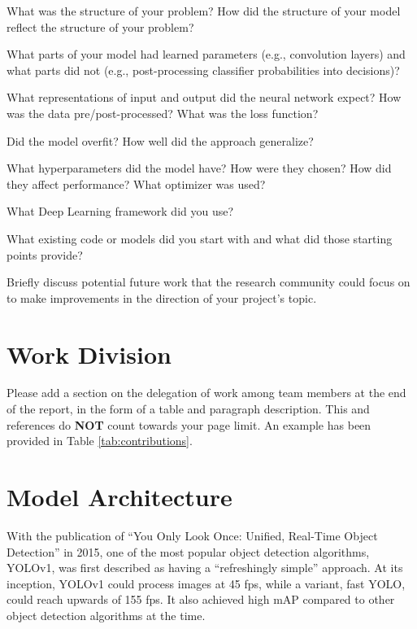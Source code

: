 \documentclass[10pt,twocolumn,letterpaper]{article}
\begin{document}
What was the structure of your problem? How did the structure of your model reflect the structure of your problem? 

What parts of your model had learned parameters (e.g., convolution layers) and what parts did not (e.g., post-processing classifier probabilities into decisions)? 

What representations of input and output did the neural network expect? How was the data pre/post-processed?
What was the loss function? 

Did the model overfit? How well did the approach generalize? 

What hyperparameters did the model have? How were they chosen? How did they affect performance? What optimizer was used? 

What Deep Learning framework did you use? 

What existing code or models did you start with and what did those starting points provide? 

Briefly discuss potential future work that the research community could focus on to make improvements in the direction of your project's topic.



\section{Work Division}

Please add a section on the delegation of work among team members at the end of the report, in the form of a table and paragraph description. This and references do \textbf{NOT} count towards your page limit. An example has been provided in Table \ref{tab:contributions}.

\newpage
\newpage

\section{Model Architecture}

With the publication of “You Only Look Once: Unified, Real-Time Object Detection” in 2015, one of the most popular object detection algorithms, YOLOv1, was first described as having a “refreshingly simple” approach. At its inception, YOLOv1 could process images at 45 fps, while a variant, fast YOLO, could reach upwards of 155 fps. It also achieved high mAP compared to other object detection algorithms at the time. 
\end{document}
